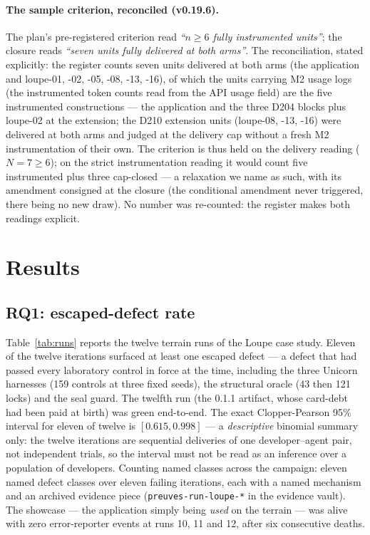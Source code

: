 \documentclass[11pt,a4paper]{article}
\newcommand{\code}[1]{\texttt{\small #1}}
\begin{document}
\paragraph{The sample criterion, reconciled (v0.19.6).} The plan's
pre-registered criterion read \emph{``$n\ge6$ fully instrumented
units''}; the closure reads \emph{``seven units fully delivered at
both arms''}. The reconciliation, stated explicitly: the register
counts seven units delivered at both arms (the application and
loupe-01, -02, -05, -08, -13, -16), of which the units carrying
M2 usage logs (the instrumented token counts read from the API
usage field) are the five instrumented constructions --- the
application and the three D204 blocks plus loupe-02 at the
extension; the D210 extension units (loupe-08, -13, -16) were
delivered at both arms and judged at the delivery cap without a
fresh M2 instrumentation of their own. The criterion is thus held
on the delivery reading ($N{=}7\ge6$); on the strict instrumentation
reading it would count five instrumented plus three cap-closed ---
a relaxation we name as such, with its amendment consigned at the
closure (the conditional amendment never triggered, there being no
new draw). No number was re-counted: the register makes both
readings explicit.

\section{Results}\label{sec:results}

\subsection{RQ1: escaped-defect rate}\label{sec:rq1}

Table~\ref{tab:runs} reports the twelve terrain runs of the Loupe case
study. Eleven of the twelve iterations surfaced at least one escaped
defect --- a defect that had passed every laboratory control in force at
the time, including the three Unicorn harnesses (159 controls at three
fixed seeds), the structural oracle (43 then 121 locks) and the seal
guard. The twelfth run (the 0.1.1 artifact, whose card-debt had been paid
at birth) was green end-to-end. The exact Clopper-Pearson 95\% interval
for eleven of twelve is $[0.615, 0.998]$ --- a \emph{descriptive}
binomial summary only: the twelve iterations are sequential deliveries
of one developer--agent pair, not independent trials, so the interval
must not be read as an inference over a population of developers.
Counting named classes across the
campaign: eleven named defect classes over eleven failing iterations,
each with a named mechanism and an archived evidence piece
(\code{preuves-run-loupe-*} in the evidence vault). The showcase ---
the application simply being \emph{used} on the terrain --- was alive with
zero error-reporter events at runs 10, 11 and 12, after six consecutive
deaths.
\end{document}
